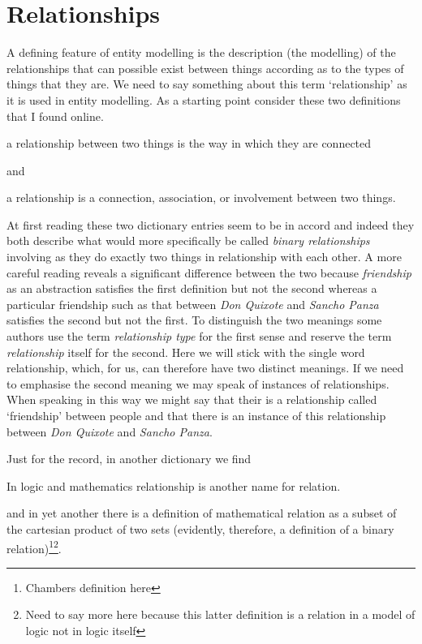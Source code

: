 
\section{Relationships}
\label{Relationships}
\mynote
A defining feature of entity modelling is the description
 (the modelling) of the relationships that can possible  exist between things according as to the types of things that they are. 
\mynote 
We need to say something about this term `relationship' as it is used in
entity modelling.
As a starting point consider these two definitions that I found online. 

\begin{erquote}
a relationship between two things is the way in which they are connected
\end{erquote}
and 
\begin{erquote}
a relationship is a connection, association, or involvement between two things.
\end{erquote}

At first reading these two dictionary entries seem to be in accord and indeed 
they both describe what would more specifically be called \textit{binary relationships} involving as they do exactly two things in relationship with each other.
A more careful reading reveals a significant difference between the two because \textit{friendship} as an abstraction satisfies the first definition but not the second whereas a particular friendship such as that between \textit{Don Quixote} and \textit{Sancho Panza} satisfies the second  but not the first. 
To distinguish the two meanings some authors use the term \textit{relationship type} for the first sense and reserve the term \textit{relationship} itself for the second. Here we will stick with the single word relationship, which, for us, can therefore have two distinct meanings. If we need to emphasise the second meaning we may speak of instances of relationships. When speaking in this way we might say that their is a relationship called `friendship' between people and that there is an instance of this relationship between \textit{Don Quixote} and \textit{Sancho Panza}.

\mynote
Just for the record, in another dictionary we find 
\begin{erquote}
In logic and mathematics relationship is another name for relation.
\end{erquote}
and in yet another there is a definition of mathematical relation as a subset of the cartesian product of two sets 
(evidently, therefore, a definition of a binary relation)\footnote{Chambers definition here}\footnote{Need to say more here because this latter definition is a relation in a model of logic not in logic itself}. 


